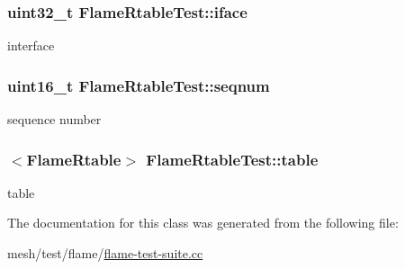 \subsubsection[{\texorpdfstring{iface}{iface}}]{\setlength{\rightskip}{0pt plus 5cm}uint32\+\_\+t Flame\+Rtable\+Test\+::iface\hspace{0.3cm}{\ttfamily [private]}}\hypertarget{classFlameRtableTest_a1241ce5c1995bb727ffa76757925fce3}{}\label{classFlameRtableTest_a1241ce5c1995bb727ffa76757925fce3}


interface 

\subsubsection[{\texorpdfstring{seqnum}{seqnum}}]{\setlength{\rightskip}{0pt plus 5cm}uint16\+\_\+t Flame\+Rtable\+Test\+::seqnum\hspace{0.3cm}{\ttfamily [private]}}\hypertarget{classFlameRtableTest_a439706f2f705047c542d395073e059e3}{}\label{classFlameRtableTest_a439706f2f705047c542d395073e059e3}


sequence number 

\subsubsection[{\texorpdfstring{table}{table}}]{$<${\bf Flame\+Rtable}$>$ Flame\+Rtable\+Test\+::table\hspace{0.3cm}{\ttfamily [private]}}\hypertarget{classFlameRtableTest_afe4986bd7f421b14f53cc6dd56cdf0f8}{}\label{classFlameRtableTest_afe4986bd7f421b14f53cc6dd56cdf0f8}


table 



The documentation for this class was generated from the following file\+:\begin{DoxyCompactItemize}
\item 
mesh/test/flame/\hyperlink{flame-test-suite_8cc}{flame-\/test-\/suite.\+cc}\end{DoxyCompactItemize}

